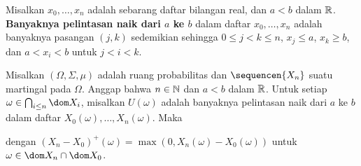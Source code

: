  Misalkan $x_0,\ldots,x_n$ adalah sebarang daftar bilangan
real, dan $a<b$ dalam $\Bbb R$. {\bf Banyaknya pelintasan naik dari $a$ ke
$b$} dalam daftar $x_0,\ldots,x_n$ adalah banyaknya pasangan $(j,k)$
sedemikian sehingga $0\le j<k\le n$, $x_j\le a$, $x_k\ge b$, dan
$a<x_i<b$ untuk $j<i<k$. %

 Misalkan $(\Omega,\Sigma,\mu)$ adalah ruang
probabilitas dan $\sequencen{X_n}$ suatu martingal pada $\Omega$. Anggap bahwa
$n\in\Bbb N$ dan $a<b$ dalam $\Bbb R$. Untuk setiap
$\omega\in\bigcap_{i\le n}\dom X_i$, misalkan $U(\omega)$ adalah banyaknya
pelintasan naik dari $a$ ke $b$ dalam daftar
$X_0(\omega),\ldots,X_n(\omega)$. Maka


\noindent dengan $(X_n-X_0)^+(\omega)=\max(0,X_n(\omega)-X_0(\omega))$
untuk $\omega\in\dom X_n\cap\dom X_0$.

